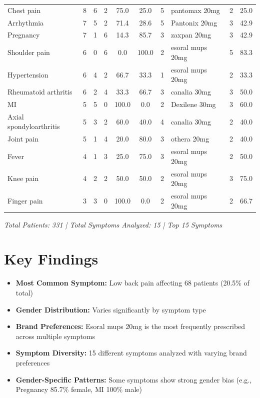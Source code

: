 \documentclass[10pt]{article}
\begin{document}
\begin{table}[h!]
{\begin{tabular}{l|c|c|c|c|c|c|l|c|c}
Chest pain & 8 & 6 & 2 & 75.0 & 25.0 & 5 & pantomax 20mg & 2 & 25.0 \\
Arrhythmia & 7 & 5 & 2 & 71.4 & 28.6 & 5 & Pantonix 20mg & 3 & 42.9 \\
\rowcolor{altrowcolor}
Pregnancy & 7 & 1 & 6 & 14.3 & 85.7 & 3 & zaxpan 20mg & 3 & 42.9 \\
Shoulder pain & 6 & 0 & 6 & 0.0 & 100.0 & 2 & esoral mups 20mg & 5 & 83.3 \\
\rowcolor{altrowcolor}
Hypertension & 6 & 4 & 2 & 66.7 & 33.3 & 1 & esoral mups 20mg & 2 & 33.3 \\
Rheumatoid arthritis & 6 & 2 & 4 & 33.3 & 66.7 & 3 & canalia 30mg & 3 & 50.0 \\
\rowcolor{altrowcolor}
MI & 5 & 5 & 0 & 100.0 & 0.0 & 2 & Dexilene 30mg & 3 & 60.0 \\
Axial spondyloarthritis & 5 & 3 & 2 & 60.0 & 40.0 & 4 & canalia 30mg & 2 & 40.0 \\
\rowcolor{altrowcolor}
Joint pain & 5 & 1 & 4 & 20.0 & 80.0 & 3 & othera 20mg & 2 & 40.0 \\
Fever & 4 & 1 & 3 & 25.0 & 75.0 & 3 & esoral mups 20mg & 2 & 50.0 \\
\rowcolor{altrowcolor}
Knee pain & 4 & 2 & 2 & 50.0 & 50.0 & 2 & esoral mups 20mg & 3 & 75.0 \\
Finger pain & 3 & 3 & 0 & 100.0 & 0.0 & 2 & esoral mups 20mg & 2 & 66.7 \\
\bottomrule
\end{tabular}%
}
\end{table}

\vspace{1cm}

\textit{Total Patients: 331 | Total Symptoms Analyzed: 15 | Top 15 Symptoms}

\section{Key Findings}

\begin{itemize}
\item \textbf{Most Common Symptom:} Low back pain affecting 68 patients (20.5\% of total)
\item \textbf{Gender Distribution:} Varies significantly by symptom type
\item \textbf{Brand Preferences:} Esoral mups 20mg is the most frequently prescribed across multiple symptoms
\item \textbf{Symptom Diversity:} 15 different symptoms analyzed with varying brand preferences
\item \textbf{Gender-Specific Patterns:} Some symptoms show strong gender bias (e.g., Pregnancy 85.7\% female, MI 100\% male)
\end{itemize}
\end{document}
